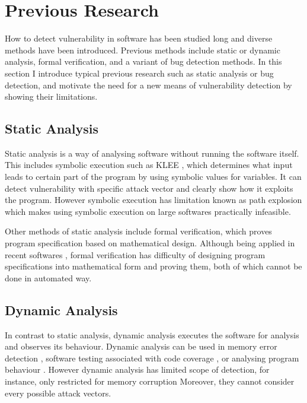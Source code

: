 \section{Previous Research}
\label{section:previous}

How to detect vulnerability in software has been studied long and diverse methods have been introduced.
Previous methods include static or dynamic analysis, formal verification, and a variant of bug detection methods.
In this section I introduce typical previous research such as static analysis or bug detection,
and motivate the need for a new means of vulnerability detection by showing their limitations.

\subsection{Static Analysis}

Static analysis is a way of analysing software without running the software itself.
This includes symbolic execution such as KLEE \cite{cadar2008klee}, which determines what input leads to certain part of the program by using symbolic values for variables.
It can detect vulnerability with specific attack vector and clearly show how it exploits the program.
However symbolic execution has limitation known as path explosion which makes using symbolic execution on large softwares practically infeasible.

Other methods of static analysis include formal verification, which proves program specification based on mathematical design.
Although being applied in recent softwares \cite{rustbelt}, formal verification has difficulty of designing program specifications into mathematical form and proving them, both of which cannot be done in automated way.

\subsection{Dynamic Analysis}

In contrast to static analysis, dynamic analysis executes the software for analysis and observes its behaviour.
Dynamic analysis can be used in memory error detection \cite{valgrind}, software testing associated with code coverage \cite{huang2015code},
or analysing program behaviour \cite{newsome2005dynamic, enck2014taintdroid}.
However dynamic analysis has limited scope of detection, for instance, only restricted for memory corruption
Moreover, they cannot consider every possible attack vectors.


